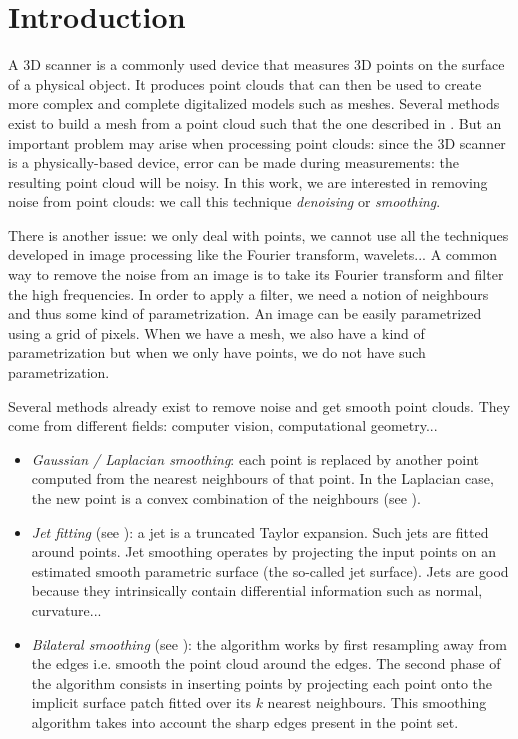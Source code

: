 \chapter{Introduction}

A 3D scanner is a commonly used device that measures 3D points on the surface of
a physical object.  It produces point clouds that can then be used to create
more complex and complete digitalized models such as meshes. Several methods
exist to build a mesh from a point cloud such that the one described in
\cite{alexa2003computing}. But an important problem may arise when processing
point clouds: since the 3D scanner is a physically-based device, error can be
made during measurements: the resulting point cloud will be noisy. In this work,
we are interested in removing noise from point clouds: we call this technique
\textit{denoising} or \textit{smoothing}.

There is another issue: we only deal with points, we cannot use all the
techniques developed in image processing like the Fourier transform, wavelets...
A common way to remove the noise from an image is to take its Fourier transform
and filter the high frequencies. In order to apply a filter, we need a notion of
neighbours and thus some kind of parametrization. An image can be easily
parametrized using a grid of pixels. When we have a mesh, we also have a kind of
parametrization but when we only have points, we do not have such
parametrization.

Several methods already exist to remove noise and get smooth point clouds.
They come from different fields: computer vision, computational geometry...

\begin{itemize}
    \item \textit{Gaussian / Laplacian smoothing}: each point is replaced by
        another point computed from the nearest neighbours of that point. In
        the Laplacian case, the new point is a convex combination of the
        neighbours (see \cite{vollmer1999improved}).
    \item \textit{Jet fitting} (see \cite{cazals2005estimating}): a jet is a truncated
        Taylor expansion. Such jets are fitted around points. Jet smoothing
        operates by projecting the input points on an estimated smooth
        parametric surface (the so-called jet surface). Jets are good because
        they intrinsically contain differential information such as normal,
        curvature...
    \item \textit{Bilateral smoothing} (see \cite{huang2013edge}): the algorithm
        works by first resampling away from the edges i.e. smooth the point
        cloud around the edges. The second phase of the algorithm consists in
        inserting points by projecting each point onto the implicit surface
        patch fitted over its $ k $ nearest neighbours. This smoothing algorithm
        takes into account the sharp edges present in the point set.
\end{itemize}

